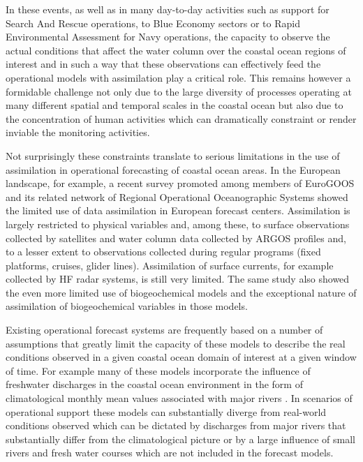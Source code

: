 In these events, as well as in many day-to-day activities such as
support for Search And Rescue operations, to Blue Economy sectors or
to Rapid Environmental Assessment for Navy operations, the capacity to
observe the actual conditions that affect the water column over the
coastal ocean regions of interest and in such a way that these
observations can effectively feed the operational models with
assimilation play a critical role. This remains however a formidable
challenge not only due to the large diversity of processes operating
at many different spatial and temporal scales in the coastal ocean but
also due to the concentration of human activities which can
dramatically constraint or render inviable the monitoring activities.

Not surprisingly these constraints translate to serious limitations in
the use of assimilation in operational forecasting of coastal ocean
areas. In the European landscape, for example, a recent survey
promoted among members of EuroGOOS and its related network of Regional
Operational Oceanographic Systems \cite{capet2020} showed the limited
use of data assimilation in European forecast centers. Assimilation
is largely restricted to physical variables and, among these, to
surface observations collected by satellites and water column data
collected by ARGOS profiles and, to a lesser extent to observations
collected during regular programs (fixed platforms, cruises, glider
lines). Assimilation of surface currents, for example collected by HF
radar systems, is still very limited. The same study also showed the
even more limited use of biogeochemical models and the exceptional
nature of assimilation of biogeochemical variables in those models.
 
Existing operational forecast systems are frequently based on a number
of assumptions that greatly limit the capacity of these models to
describe the real conditions observed in a given coastal ocean domain
of interest at a given window of time. For example many of these
models incorporate the influence of freshwater discharges in the
coastal ocean environment in the form of climatological monthly mean
values associated with major rivers \cite{marta012}.  In scenarios of
operational support these models can substantially diverge from
real-world conditions observed which can be dictated by discharges
from major rivers that substantially differ from the climatological
picture or by a large influence of small rivers and fresh water
courses which are not included in the forecast models.
 
